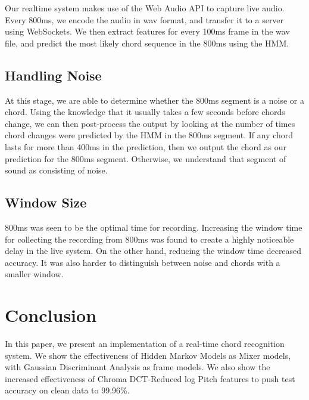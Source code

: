 \documentclass{article}
\begin{document}
Our realtime system makes use of the Web Audio API to capture live audio. Every
800ms, we encode the audio in wav format, and transfer it to a server using
WebSockets. We then extract features for every 100ms frame in the wav file, and
predict the most likely chord sequence in the 800ms using the HMM.

\subsection{Handling Noise}
At this stage, we are able to determine whether the 800ms segment is a noise or
a chord. Using the knowledge that it usually takes a few seconds before chords
change, we can then post-process the output by looking at the number of times
chord changes were predicted by the HMM in the 800ms segment. If any chord lasts
for more than 400ms in the prediction, then we output the chord as our
prediction for the 800ms segment. Otherwise, we understand that segment of sound
as consisting of noise.

\subsection{Window Size}
800ms was seen to be the optimal time for recording. Increasing the window time
for collecting the recording from 800ms was found to create a highly noticeable
delay in the live system. On the other hand, reducing the window time decreased
accuracy. It was also harder to distinguish between noise and chords with a
smaller window.

\section{Conclusion}
In this paper, we present an implementation of a real-time chord recognition
system. We show the effectiveness of Hidden Markov Models as Mixer models, with
Gaussian Discriminant Analysis as frame models. We also show the increased
effectiveness of Chroma DCT-Reduced log Pitch features to push test accuracy on
clean data to 99.96\%.




\end{document}
